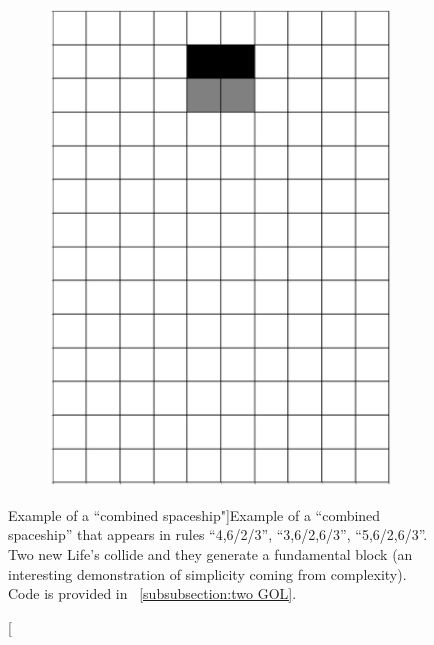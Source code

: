 \documentclass[12pt]{article}
\numberwithin{figure}{section} %
\begin{document}
\begin{figure}[H]
\begin{subfigure}{0.24\textwidth}
     		\includegraphics[width=\linewidth]{Section4/37.7}
     		\subcaption{}
   	\end{subfigure}
   	\caption[Example of a “combined spaceship"]{Example of a “combined spaceship” that appears in rules “4,6/2/3”, “3,6/2,6/3”, “5,6/2,6/3”. Two new Life's collide and they generate a fundamental block (an interesting demonstration of simplicity coming from complexity). Code is provided in ~\ref{subsubsection:two GOL}. }
   	\label{fig:two GOL}
	\vspace{-1.5em}
\end{figure}
\end{document}
